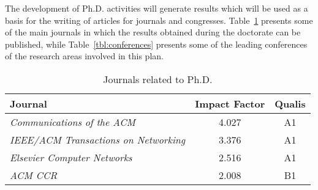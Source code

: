 	The development of Ph.D. activities will generate results which will be used as a basis for the writing of articles for journals and congresses. Table~\ref{tbl:journals} presents some of the main journals in which the results obtained during the doctorate can be published, while Table~\ref{tbl:conferences} presents some of the leading conferences of the research areas involved in this plan.

	\newpage

	\begin{table}[htp]
	\centering
	\begin{tabularx}{\textwidth}{l | c | c}
	\hline
	{\bf Journal}                                           & {\bf Impact Factor} & \textbf{Qualis} \\ \hline
    \textit{Communications of the ACM}                        &      4.027        & A1 \\ \hline
	\textit{IEEE/ACM Transactions on Networking}              &      3.376        & A1 \\ \hline
	\textit{Elsevier Computer Networks}                       &      2.516        & A1 \\ \hline
	\textit{ACM CCR}                					      &      2.008        & B1 \\ \hline
	

	\end{tabularx}
	\caption{Journals related to Ph.D.}
	\label{tbl:journals}
	\end{table}

